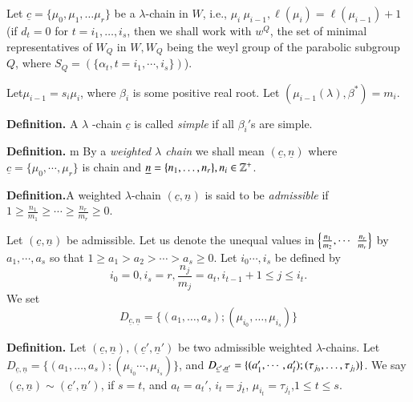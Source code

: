 \smallskip
\noindent
Let $\underline{c}= \{ \mu_{0}, \mu_{1}, \ldots \mu_{r}\}$ be a $\lambda$-chain in $W$, i.e., $\mu_{i} \> \mu_{i-1}, \ell(\mu_{i}) = \ell(\mu_{i-1})+1$ (if $d_{t}=0$ for $t = i_{1}, \ldots, i_{s}$, then we shall work with $w^{Q}$, the set of minimal representatives of $W_{Q}$ in $W, W_{Q}$ being the weyl group of the parabolic subgroup $Q$, where $S_{Q}=(\{\alpha_{t}, t= i_{1}, \cdots, i_{s}\})$). 

Let\pageoriginale $\mu_{i-1}= s_{i}\mu_{i}$, where $\beta_{i}$ is some positive real root. Let $(\mu_{i-1}(\lambda), \beta^{*}) = m_{i}$.

\noindent
{\bfseries {} Definition.}\label{A. 1. definition.} A $\lambda$ -chain $\underline{c}$ is called \textit{simple} if all $\beta_{i}'$s are simple. 

\medskip
\noindent
{\bfseries {} Definition.}\label{A. 2. definition.} m By a \textit{weighted $\lambda$ chain} we shall mean $(\underline{c}, \underline{n})$ where $\underline{c}= \{ \mu_{0}, \cdots, \mu_{r}\}$ is chain and $\underline{n} =\{n_{1}, \ldots, n_{r}\}, n_{i} \in \mathbb{Z}^{+}$.

\medskip
\noindent
{\bfseries {} Definition.}\label{A. 3. definition.}A weighted $\lambda$-chain $(\underline{c}, \underline{n})$ is said to be \textit{admissible} if $1 \geq \frac{n_{1}}{m_{1}}\geq \cdots \geq \frac{n_{r}}{m_{r}} \geq 0$.

Let $(\underline{c}, \underline{n})$ be admissible. Let us denote the unequal values in $\left\{\frac{n_{1}}{m_{2}}, \cdots\right.\break \left. \frac{n_{r}}{m_{r}}\right\}$ by $a_{1}, \cdots, a_{s}$ so that $1 \geq a_{1}> a_{2} > \cdots > a_{s} \geq 0$. Let $i_{0}\cdots, i_{s}$ be defined by
$$
i_{0}=0, i_{s}=r, \frac{n_{j}}{m_{j}} = a_{t}, i_{t-1}+1 \leq j \leq i_{t}.
$$
We set
$$
D_{\underline{c}, \underline{n}} = \{(a_{1}, \ldots, a_{s});(\mu_{i_{0}},\ldots,\mu_{i_{s}})\}
$$

\medskip
\noindent
{\bfseries {} Definition.}\label{A. 4. definition.} Let $(\underline{c}, \underline{n}), (\underline{c}', \underline{n}')$ be two admissible weighted $\lambda$-chains. Let $D_{\underline{c}, \underline{n}} =\{(a_{1}, \ldots, a_{s});(\mu_{i_{0}}\cdots,\mu_{i_{s}})\}$, and $ D_{\underline{c}', \underline{n}'} = \{(a_{1}', \cdots, a_{l}');\break (\tau_{j_{0}}, \ldots, \tau_{j_{l}})\}$. We say $(\underline{c}, \underline{n}) \sim (\underline{c}',\underline{n}')$, if $s =t$, and $a_{t}=a_{t}'$, $i_{t}=j_{t}$, $\mu_{i_{t}} = \tau_{j_{t}}$,$1 \leq t \leq s$.

